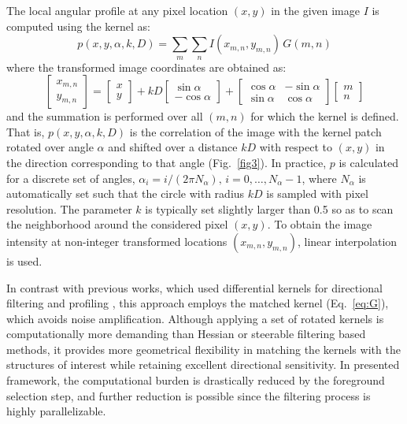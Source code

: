 The local angular profile at any pixel location $(x,y)$ in the given image $I$ is computed using the kernel as:
\begin{equation}
p(x,y,\alpha,k,D)=\sum_{m}\sum_{n} I(x_{m,n},y_{m,n})\,G(m,n)
\label{eq:angularprofile}
\end{equation}
where the transformed image coordinates are obtained as:
\begin{equation}
\begin{bmatrix} x_{m,n} \\ y_{m,n} \end{bmatrix} =
\begin{bmatrix} x \\ y \end{bmatrix} +
kD\begin{bmatrix} \sin\alpha \\ -\!\cos\alpha \end{bmatrix} +
\begin{bmatrix} \cos\alpha & -\!\sin\alpha \\ \sin\alpha & \cos\alpha \end{bmatrix}
\begin{bmatrix} m \\ n \end{bmatrix}
\label{eq:xymn}
\end{equation}
and the summation is performed over all $(m,n)$ for which the kernel is defined. That is, $p(x,y,\alpha,k,D)$ is the correlation of the image with the kernel patch rotated over angle $\alpha$ and shifted over a distance $kD$ with respect to $(x,y)$ in the direction corresponding to that angle (Fig.~\ref{fig3}). In practice, $p$ is calculated for a discrete set of angles, $\alpha_{i}=i/(2\pi N_{\alpha}),\, i=0,\dots,N_{\alpha}-1$, where $N_{\alpha}$ is automatically set such that the circle with radius $kD$ is sampled with pixel resolution. The parameter $k$ is typically set slightly larger than 0.5 so as to scan the neighborhood around the considered pixel $(x,y)$. To obtain the image intensity at non-integer transformed locations $(x_{m,n},y_{m,n})$, linear interpolation is used.

In contrast with previous works, which used differential kernels for directional filtering and profiling \cite{yu1998rotated, can1999rapid, zhang2007automated}, this approach employs the matched kernel (Eq.~\ref{eq:G}), which avoids noise amplification. Although applying a set of rotated kernels is computationally more demanding than Hessian or steerable filtering based methods, it provides more geometrical flexibility in matching the kernels with the structures of interest while retaining excellent directional sensitivity. In presented framework, the computational burden is drastically reduced by the foreground selection step, and further reduction is possible since the filtering process is highly parallelizable.

